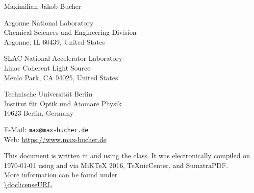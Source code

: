 \begin{flushleft}
{\Large Maximilian Jakob Bucher}\\
\footnotesize{Argonne National Laboratory\\
Chemical Sciences and Engineering Division\\
Argonne, IL 60439, United States\\
\vspace{0.5cm}

SLAC National Accelerator Laboratory\\
Linac Coherent Light Source\\
Menlo Park, CA 94025, United States
\vspace{0.5cm}

Technische Universität Berlin\\
Institut für Optik und Atomare Physik\\
10623 Berlin, Germany
\vspace{0.5cm}

E-Mail: \href{mailto:max@max-bucher.de}{\nolinkurl{max@max-bucher.de} }\\
Web: \url{https://www.max-bucher.de}}
\end{flushleft}
%
%
%
\vspace{7.5cm}
\footnotesize{This document is written in  and  using the  class. It was electronically compiled on {\isodate\today} using  and  via MiKTeX 2016, TeXnicCenter, and SumatraPDF.}\\
%
\null \vspace{1cm}
%
\normalsize{\doclicenseThis
More information can be found under\\
\url{\doclicenseURL}}
